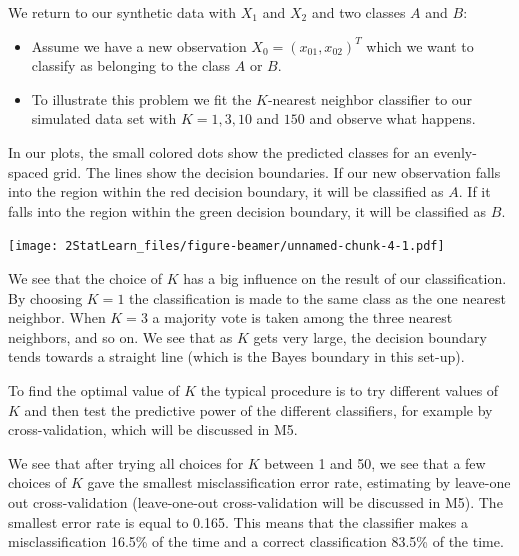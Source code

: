\documentclass[ignorenonframetext,]{beamer}
\providecommand{\tightlist}{%
  \setlength{\itemsep}{0pt}\setlength{\parskip}{0pt}}
\begin{document}
\begin{frame}

We return to our synthetic data with \(X_1\) and \(X_2\) and two classes
\(A\) and \(B\):

\begin{itemize}
\tightlist
\item
  Assume we have a new observation \(X_0 = (x_{01}, x_{02})^T\) which we
  want to classify as belonging to the class \(A\) or \(B\).
\item
  To illustrate this problem we fit the \(K\)-nearest neighbor
  classifier to our simulated data set with \(K = 1, 3, 10\) and \(150\)
  and observe what happens.
\end{itemize}

In our plots, the small colored dots show the predicted classes for an
evenly-spaced grid. The lines show the decision boundaries. If our new
observation falls into the region within the red decision boundary, it
will be classified as \(A\). If it falls into the region within the
green decision boundary, it will be classified as \(B\).

\end{frame}

\begin{frame}

\texttt{[image: 2StatLearn\_files/figure-beamer/unnamed-chunk-4-1.pdf]}

\end{frame}

\begin{frame}

We see that the choice of \(K\) has a big influence on the result of our
classification. By choosing \(K=1\) the classification is made to the
same class as the one nearest neighbor. When \(K=3\) a majority vote is
taken among the three nearest neighbors, and so on. We see that as \(K\)
gets very large, the decision boundary tends towards a straight line
(which is the Bayes boundary in this set-up).

To find the optimal value of \(K\) the typical procedure is to try
different values of \(K\) and then test the predictive power of the
different classifiers, for example by cross-validation, which will be
discussed in M5.

We see that after trying all choices for \(K\) between 1 and 50, we see
that a few choices of \(K\) gave the smallest misclassification error
rate, estimating by leave-one out cross-validation (leave-one-out
cross-validation will be discussed in M5). The smallest error rate is
equal to 0.165. This means that the classifier makes a misclassification
16.5\% of the time and a correct classification 83.5\% of the time.

\end{frame}
\end{document}
